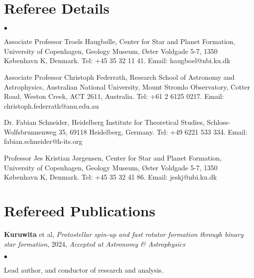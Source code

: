 \documentclass[margin,line]{res}
\newenvironment{list1}{
	\begin{list}{\ding{113}}{%
			\setlength{\itemsep}{0in}
			\setlength{\parsep}{0in} \setlength{\parskip}{0in}
			\setlength{\topsep}{0in} \setlength{\partopsep}{0in} 
			\setlength{\leftmargin}{0.17in}}}{\end{list}}
\newenvironment{list2}{
	\begin{list}{$\bullet$}{%
			\setlength{\itemsep}{0in}
			\setlength{\parsep}{0in} \setlength{\parskip}{0in}
			\setlength{\topsep}{0in} \setlength{\partopsep}{0in} 
			\setlength{\leftmargin}{0.2in}}}{\end{list}}
\begin{document}
\begin{resume}
		\section{\sc Referee Details}
		\begin{list2}
			\item Associate Professor Troels Haugb{\o}lle, Center for Star and Planet Formation, University of Copenhagen, Geology Museum, Øster Voldgade 5-7, 1350 København K, Denmark. Tel: +45 35 32 11 41. Email: haugboel@nbi.ku.dk
			\item Associate Professor Christoph Federrath, Research School of Astronomy and Astrophysics, Australian National University, Mount Stromlo Observatory, Cotter Road, Weston Creek, ACT 2611, Australia. Tel: +61 2 6125 0217. Email: christoph.federrath@anu.edu.au
                \item Dr. Fabian Schneider, Heidelberg Institute for Theoretical Studies, Schloss-Wolfsbrunnenweg 35, 69118 Heidelberg, Germany. Tel: +49 6221 533 334. Email: fabian.schneider@h-its.org
			\item Professor Jes Kristian J{\o}rgensen, Center for Star and Planet Formation, University of Copenhagen, Geology Museum, Øster Voldgade 5-7, 1350 København K, Denmark. Tel: +45 35 32 41 86. Email: jeskj@nbi.ku.dk
		\end{list2}
	
\section{\sc Refereed Publications}
\begin{list1}
        \item[]{\bf Kuruwita} et al, \emph{Protostellar spin-up and fast rotator formation through binary star formation}, 2024, \emph{Accepted at Astronomy \& Astrophysics}
	\begin{list2}
		\item Lead author, and conductor of research and analysis.\\
	\end{list2}


\end{list1}
\end{resume}
\end{document}
